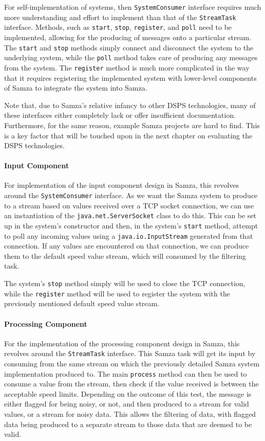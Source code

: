 For self-implementation of systems, then \texttt{SystemConsumer} interface requires much more understanding and effort to
implement than that of the \texttt{StreamTask} interface. Methods, such as \texttt{start}, \texttt{stop}, \texttt{register},
and \texttt{poll} need to be implemented, allowing for the producing of messages onto a particular stream. The \texttt{start}
and \texttt{stop} methods simply connect and disconnect the system to the underlying system, while the \texttt{poll}
method takes care of producing any messages from the system. The \texttt{register} method is much more complicated in the
way that it requires registering the implemented system with lower-level components of Samza to integrate the system into
Samza.

Note that, due to Samza's relative infancy to other DSPS technologies, many of these interfaces either completely lack
or offer insufficient documentation. Furthermore, for the same reason, example Samza projects are hard to find. This is
a key factor that will be touched upon in the next chapter on evaluating the DSPS technologies.

\paragraph{Input Component}

For implementation of the input component design in Samza, this revolves around the \texttt{SystemConsumer} interface.
As we want the Samza system to produce to a stream based on values received over a TCP socket connection, we can use
an instantiation of the \texttt{java.net.ServerSocket} class to do this. This can be set up in the system's constructor
and then, in the system's \texttt{start} method, attempt to poll any incoming values using a \texttt{java.io.InputStream} generated
from that connection. If any values are encountered on that connection, we can produce them to the default speed value
stream, which will consumed by the filtering task.

The system's \texttt{stop} method simply will be used to close the TCP connection, while the \texttt{register} method will
be used to register the system with the previously mentioned default speed value stream.

\paragraph{Processing Component}

For the implementation of the processing component design in Samza, this revolves around the \texttt{StreamTask} interface.
This Samza task will get its input by consuming from the same stream on which the previously detailed Samza system implementation
produced to. The main \texttt{process} method can then be used to consume a value from the stream, then check if the value
received is between the acceptable speed limits. Depending on the outcome of this test, the message is either flagged for
being noisy, or not, and then produced to a stream for valid values, or a stream for noisy data. This allows the filtering
of data, with flagged data being produced to a separate stream to those data that are deemed to be valid.

